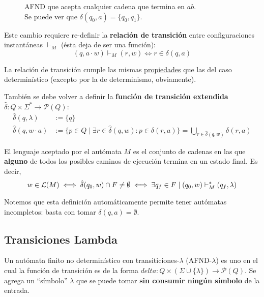\begin{figure}[H]
    \centering
    \caption*{AFND que acepta cualquier cadena que termina en $ab$. \\ Se puede ver que $\delta(q_0, a) = \{q_0, q_1\}$.}
\end{figure}

Este cambio requiere re-definir la \textbf{relación de transición} entre configuraciones instantáneas $\vdash_M$ (ésta deja de ser una función):
$$
(q, a \cdot w) \vdash_M (r, w) \iff r \in \delta(q, a)
$$

La relación de transición cumple las mismas \hyperref[subsubsec-propiedades-rel-transicion]{propiedades} que las del caso determinístico (excepto por la de determinismo, obviamente).

También se debe volver a definir la \textbf{función de transición extendida} $\hat \delta : Q \times \Sigma^* \to \mathcal P (Q)$:
$$
\begin{aligned}
    \hat \delta(q, \lambda) & := \{q\} \\
    \hat \delta(q, w \cdot a) & := \{p \in Q \mid \exists r \in \hat \delta (q, w) : p \in \delta (r, a)\} = \bigcup_{r \in \hat \delta(q, w)} \delta(r, a)
\end{aligned}
$$

El lenguaje aceptado por el autómata $M$ es el conjunto de cadenas en las que \textbf{alguno} de todos los posibles caminos de ejecución termina en un estado final. Es decir,
$$
w \in \mathcal{L}(M) \iff \hat \delta(q_0, w) \cap F \neq \emptyset \iff \exists q_f \in F \mid (q_0, w) \vdash_M^* (q_f, \lambda)
$$

Notemos que esta definición automáticamente permite tener autómatas incompletos: basta con tomar $\delta(q, a) = \emptyset$.

\subsection{Transiciones Lambda}

Un autómata finito no determinístico con transiticiones-$\lambda$ (AFND-$\lambda$) es uno en el cual la función de transición es de la forma $delta : Q \times (\Sigma \cup \{\lambda\}) \to \mathcal P (Q)$. Se agrega un ``símbolo'' $\lambda$ que se puede tomar \textbf{sin consumir ningún símbolo} de la entrada.

